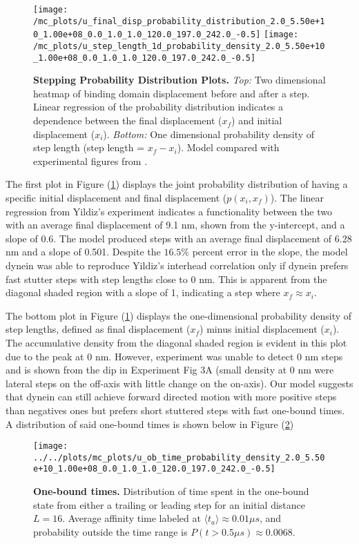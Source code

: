 \begin{figure}[H]
	\centering
	\texttt{[image: /mc\_plots/u\_final\_disp\_probability\_distribution\_2.0\_5.50e+10\_1.00e+08\_0.0\_1.0\_1.0\_120.0\_197.0\_242.0\_-0.5]}
	\texttt{[image: /mc\_plots/u\_step\_length\_1d\_probability\_density\_2.0\_5.50e+10\_1.00e+08\_0.0\_1.0\_1.0\_120.0\_197.0\_242.0\_-0.5]}
	\caption[Final Displacement Probability Distribution]{\textbf{Stepping Probability Distribution Plots.} \textit{Top:} Two dimensional heatmap of binding domain displacement before and after a step. Linear regression of the probability distribution indicates a dependence between the final displacement ($x_f$) and initial displacement ($x_i$). \textit{Bottom:} One dimensional probability density of step length (step length = $x_f-x_i$). Model compared with experimental figures from \citep{Dewitt2012}.} 
	\label{fig:DataFitYildiz}
\end{figure}
\newpage
The first plot in Figure (\ref{fig:DataFitYildiz}) displays the joint probability distribution of having a specific initial displacement and final displacement ($p(x_i,x_f)$). The linear regression from Yildiz's experiment indicates a functionality between the two with an average final displacement of 9.1 nm, shown from the y-intercept, and a slope of 0.6. The model produced steps with an average final displacement of 6.28 nm and a slope of 0.501. Despite the $16.5\%$ percent error in the slope, the model dynein was able to reproduce Yildiz's interhead correlation only if dynein prefers fast stutter steps with step lengths close to 0 nm. This is apparent from the diagonal shaded region with a slope of 1, indicating a step where $x_f\approx x_i$.


The bottom plot in Figure (\ref{fig:DataFitYildiz}) displays the one-dimensional probability density of step lengths, defined as final displacement ($x_f$) minus initial displacement ($x_i$). The accumulative density from the diagonal shaded region is evident in this plot due to the peak at 0 nm. However, experiment was unable to detect 0 nm steps and is shown from the dip in Experiment Fig 3A (small density at 0 nm were lateral steps on the off-axis with little change on the on-axis). Our model suggests that dynein can still achieve forward directed motion with more positive steps than negatives ones but prefers short stuttered steps with fast one-bound times. A distribution of said one-bound times is shown below in Figure (\ref{fig:OBtime}) 

\begin{figure}[H]
	\centering
	\texttt{[image: ../../plots/mc\_plots/u\_ob\_time\_probability\_density\_2.0\_5.50e+10\_1.00e+08\_0.0\_1.0\_1.0\_120.0\_197.0\_242.0\_-0.5]}
	\caption[One-bound times]{\textbf{One-bound times.} Distribution of time spent in the one-bound state from either a trailing or leading step for an initial distance $L=16$. Average affinity time labeled at $\langle t_a \rangle \approx 0.01 \mu s$, and probability outside the time range is $P(t>0.5\mu s) \approx 0.0068$.}
	\label{fig:OBtime}
\end{figure}

